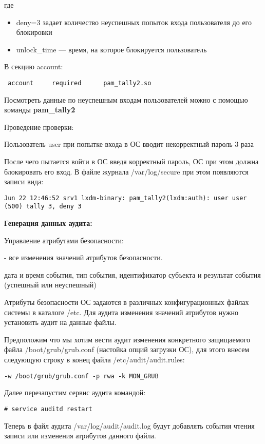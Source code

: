 \documentclass[a4paper,10pt,twoside]{article}
\begin{document}
где 
\begin{itemize}
\item deny=3 задает количество неуспешных попыток входа пользователя до его блокировки
\item unlock\_time — время, на которое блокируется пользователь
\end{itemize}


В секцию account:
\begin{verbatim}
 account     required      pam_tally2.so 
\end{verbatim} 

Посмотреть данные по неуспешным входам пользователей можно с помощью команды \textbf{pam\_tally2}

Проведение проверки:

Пользователь user при попытке входа в ОС вводит некорректный пароль 3 раза

После чего пытается войти в ОС введя корректный пароль, ОС при этом должна блокировать его вход. В файле журнала /var/log/secure при этом появляются записи вида:
\begin{verbatim}
Jun 22 12:46:52 srv1 lxdm-binary: pam_tally2(lxdm:auth): user user (500) tally 3, deny 3
\end{verbatim} 

 \textbf{Генерация данных аудита:}

Управление атрибутами безопасности: 

- все изменения значений атрибутов безопасности.

дата и время события, тип события, идентификатор субъекта и результат события (успешный или неуспешный)

Атрибуты безопасности ОС задаются в различных конфигурационных файлах системы в каталоге /etc. Для аудита изменения значений атрибутов нужно установить аудит на данные файлы.

Предположим что мы хотим вести аудит изменения конкретного защищаемого файла /boot/grub/grub.conf (настойка опций загрузки ОС), для этого внесем следующую строку в конец файла /etc/audit/audit.rules:
\begin{verbatim}
-w /boot/grub/grub.conf -p rwa -k MON_GRUB
\end{verbatim} 

Далее перезапустим сервис аудита командой:
\begin{verbatim}
# service auditd restart
\end{verbatim} 

Теперь в файл аудита /var/log/audit/audit.log будут добавлять события чтения записи или изменения атрибутов данного файла. 
\end{document}
